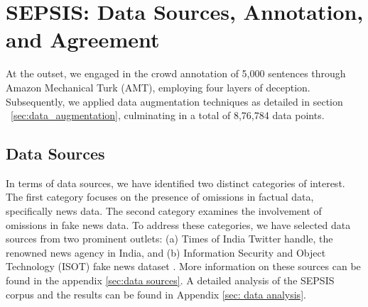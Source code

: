 

\section{SEPSIS: Data Sources, Annotation, and Agreement}
\vspace{-1mm}  
At the outset, we engaged in the crowd annotation of 5,000 sentences through Amazon Mechanical Turk (AMT), employing four layers of deception. Subsequently, we applied data augmentation techniques as detailed in section ~\ref{sec:data_augmentation}, culminating in a total of 8,76,784 data points.

\subsection{Data Sources}
\vspace{-0.5mm}  


In terms of data sources, we have identified two distinct categories of interest. The first category focuses on the presence of omissions in factual data, specifically news data. The second category examines the involvement of omissions in fake news data. To address these categories, we have selected data sources from two prominent outlets: (a) Times of India \cite{timesofindia} Twitter handle, the renowned news agency in India, and (b) Information Security and Object Technology (ISOT) fake news dataset \cite{ISOTFakeNewsDataset}. More information on these sources can be found in the appendix \ref{sec:data sources}. A detailed analysis of the SEPSIS corpus and the results can be found in Appendix \ref{sec: data analysis}.



\vspace{-1mm}
